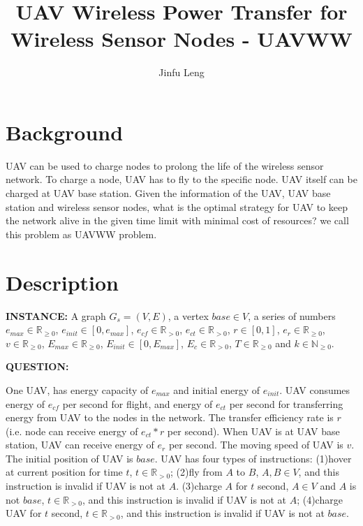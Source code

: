 \documentclass[11pt]{article}
\begin{document}
\title{UAV Wireless Power Transfer for Wireless Sensor Nodes - UAVWW}
\author{Jinfu Leng}
\maketitle
\section{Background}
UAV can be used to charge nodes to prolong the life of the wireless sensor network. To charge a node, UAV has to fly to the specific node. UAV itself can be charged at UAV base station. Given the information of the UAV, UAV base station and wireless sensor nodes, what is the optimal strategy for UAV to keep the network alive in the given time limit with minimal cost of resources? we call this problem as UAVWW problem.

\section{Description}
\noindent
\textbf{INSTANCE:} 
A graph $G_s = (V, E)$, a vertex $base \in V$, a series of numbers $e_{max} \in \mathbb{R}_{\geq0}$, $e_{init} \in [0, e_{max}]$, $e_{cf} \in \mathbb{R}_{>0}$, $e_{ct} \in \mathbb{R}_{>0}$, $r \in [0, 1]$, $e_r \in \mathbb{R}_{\geq0}$, $v \in \mathbb{R}_{\geq0}$, $E_{max} \in \mathbb{R}_{\geq0}$, $E_{init} \in [0, E_{max}]$, $E_{c} \in \mathbb{R}_{>0}$, $T \in \mathbb{R}_{\geq0}$ and $k \in \mathbb{N}_{\geq0}$.

\noindent
\textbf{QUESTION:}

One UAV, has energy capacity of $e_{max}$ and initial energy of $e_{init}$. UAV consumes energy of $e_{cf}$ per second for flight, and energy of $e_{ct}$ per second for transferring energy from UAV to the nodes in the network. The transfer efficiency rate is $r$ (i.e. node can receive energy of $e_{ct}*r$ per second). When UAV is at UAV base station, UAV can receive energy of $e_r$ per second. The moving speed of UAV is $v$. The initial position of UAV is $base$. UAV has four types of instructions: (1)hover at current position for time $t$, $t \in \mathbb{R}_{>0}$; (2)fly from $A$ to $B$, $A,B \in V$, and this instruction is invalid if UAV is not at $A$. (3)charge $A$ for $t$ second, $A \in V$ and $A$ is not $base$, $t \in \mathbb{R}_{>0}$, and this instruction is invalid if UAV is not at $A$; (4)charge UAV for $t$ second, $t \in \mathbb{R}_{>0}$, and this instruction is invalid if UAV is not at $base$.
\end{document}
